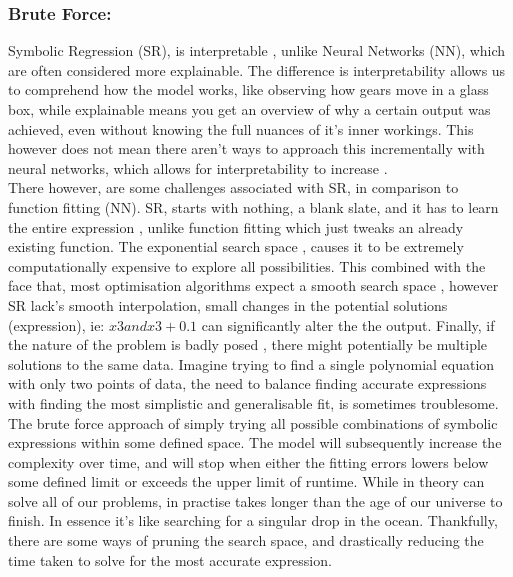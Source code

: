 \documentclass{article}
\begin{document}
\subsubsection{Brute Force: }
Symbolic Regression (SR), is interpretable \cite{Aldeia2022}, unlike Neural Networks (NN), which are often considered more explainable. The difference is interpretability allows us to comprehend how the model works,
like observing how gears move in a glass box, while explainable means you get an overview of why a
certain output was achieved, even without knowing the full nuances of it’s inner workings. This however does not mean there aren't ways to approach this incrementally with neural networks, which allows for interpretability to increase \cite{badiri2020}.\\

There however, are some challenges associated with SR, in comparison to function fitting (NN). SR,
starts with nothing, a blank slate, and it has to learn the entire expression \cite{Cranmer2020}, unlike function fitting
which just tweaks an already existing function. The exponential search space \cite{Worm2014} , causes it to be
extremely computationally expensive to explore all possibilities. This combined with the face that,
most optimisation algorithms expect a smooth search space \cite{Makke2024}, however SR lack’s smooth interpolation, small changes in the potential solutions (expression), ie: $ x3 and x3 + 0.1$ can significantly alter
the the output. Finally, if the nature of the problem is badly posed \cite{Rivero2022}, there might potentially be
multiple solutions to the same data. Imagine trying to find a single polynomial equation with only two
points of data, the need to balance finding accurate expressions with finding the most simplistic and
generalisable fit, is sometimes troublesome.\\

The brute force approach of simply trying all possible combinations of symbolic expressions within some defined space. The model will subsequently increase the complexity over time, and will stop when either the fitting errors lowers below some defined limit or exceeds the upper limit of runtime. While in theory can solve all of our problems, in practise takes longer than the age of our universe to finish. In essence it's like searching for a singular drop in the ocean. Thankfully, there are some ways of pruning the search space, and drastically reducing the time taken to solve for the most accurate expression. \\ 
\end{document}
